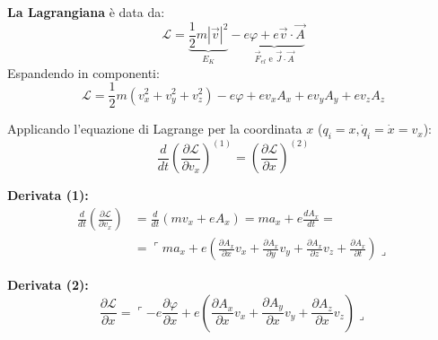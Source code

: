 \documentclass[11pt, a4paper]{article}
\begin{document}
\noindent
\textbf{La Lagrangiana} è data da:
\begin{equation}
    \boxed{ \mathcal{L} = \underbrace{\frac{1}{2}m|\vec{v}|^2}_{E_K} - \underbrace{e\varphi + e\vec{v}\cdot\vec{A}}_{\vec{F}_{el} \text{ e } \vec{J}\cdot\vec{A}} }
\end{equation}
Espandendo in componenti:
\begin{equation*}
    \mathcal{L} = \frac{1}{2}m(v_x^2 + v_y^2 + v_z^2) - e\varphi + ev_x A_x + ev_y A_y + ev_z A_z
\end{equation*}

Applicando l'equazione di Lagrange per la coordinata $x$ ($q_i = x, \dot{q}_i = \dot{x} = v_x$):
\begin{equation}
    \boxed{ \frac{d}{dt}\left(\frac{\partial \mathcal{L}}{\partial v_x}\right)^{(1)} = \left(\frac{\partial \mathcal{L}}{\partial x}\right)^{(2)} }
\end{equation}

\textbf{Derivata (1):}
\begin{align*}
    \frac{d}{dt}\left(\frac{\partial \mathcal{L}}{\partial v_x}\right) &= \frac{d}{dt}(mv_x + eA_x) = ma_x + e\frac{dA_x}{dt} = \\
    &= \ulcorner ma_x + e\left( \frac{\partial A_x}{\partial x}v_x + \frac{\partial A_x}{\partial y}v_y + \frac{\partial A_x}{\partial z}v_z + \frac{\partial A_x}{\partial t} \right) \lrcorner
\end{align*}

\textbf{Derivata (2):}
\begin{equation*}
    \frac{\partial \mathcal{L}}{\partial x} = \ulcorner -e\frac{\partial \varphi}{\partial x} + e\left( \frac{\partial A_x}{\partial x}v_x + \frac{\partial A_y}{\partial x}v_y + \frac{\partial A_z}{\partial x}v_z \right) \lrcorner
\end{equation*}
\end{document}
